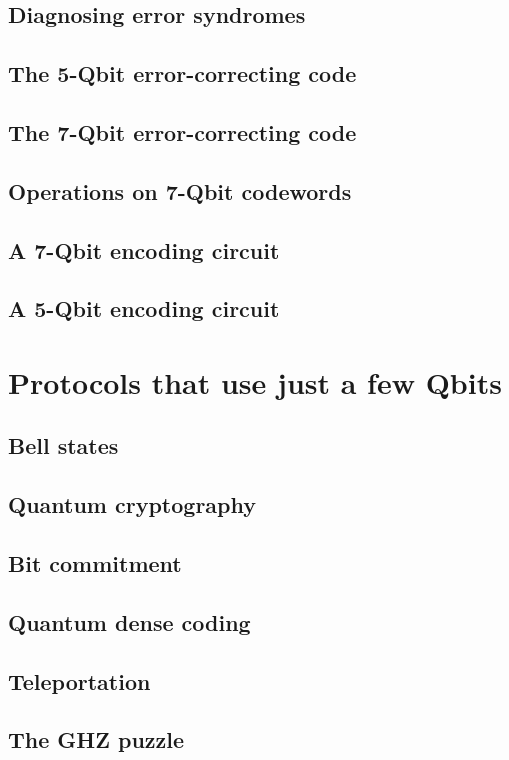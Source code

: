 \documentclass{book}
\theoremstyle{definition}
\begin{document}
\subsection{Diagnosing error syndromes}
\subsection{The 5-Qbit error-correcting code}
\subsection{The 7-Qbit error-correcting code}
\subsection{Operations on 7-Qbit codewords}
\subsection{A 7-Qbit encoding circuit}
\subsection{A 5-Qbit encoding circuit}

\newpage

\section{Protocols that use just a few Qbits}

\subsection{Bell states}
\subsection{Quantum cryptography}
\subsection{Bit commitment}
\subsection{Quantum dense coding}
\subsection{Teleportation}
\subsection{The GHZ puzzle}
\end{document}
